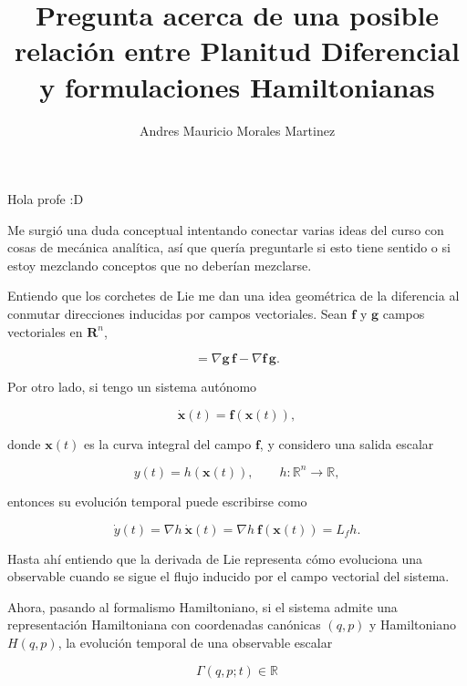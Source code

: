 \documentclass[10pt, oneside]{article}
\title{Pregunta acerca de una posible relación entre Planitud Diferencial y formulaciones Hamiltonianas}
\author{Andres Mauricio Morales Martinez}
\date{}
\newcommand{\R}{\mathbb{R}}
\begin{document}
\maketitle

Hola profe :D

Me surgió una duda conceptual intentando conectar varias ideas del curso con cosas de mecánica analítica, así que quería preguntarle si esto tiene sentido o si estoy mezclando conceptos que no deberían mezclarse.

Entiendo que los corchetes de Lie me dan una idea geométrica de la diferencia al conmutar direcciones inducidas por campos vectoriales. Sean $\mathbf{f}$ y $\mathbf{g}$ campos vectoriales en $\mathbf{R}^n$,

\begin{equation}
	[\mathbf{f},\mathbf{g}]
	=
	\nabla \mathbf{g}\,\mathbf{f}
	-
	\nabla \mathbf{f}\,\mathbf{g}.
\end{equation}

Por otro lado, si tengo un sistema autónomo

\begin{equation}
	\dot{\mathbf{x}}(t)
	=
	\mathbf{f}(\mathbf{x}(t)),
	\label{eq:dynamic}
\end{equation}

donde $\mathbf{x}(t)$ es la curva integral del campo $\mathbf{f}$, y considero una salida escalar

\begin{equation}
	y(t)
	=
	h(\mathbf{x}(t)),
	\qquad
	h:\R^n \to \R,
\end{equation}

entonces su evolución temporal puede escribirse como

\begin{equation}
	\dot{y}(t)
	=
	\nabla h~
	\dot{\mathbf{x}}(t)
	=
	\nabla h~
	\mathbf{f}(\mathbf{x}(t))
	=
	L_f h.
\end{equation}

Hasta ahí entiendo que la derivada de Lie representa cómo evoluciona una observable cuando se sigue el flujo inducido por el campo vectorial del sistema.

Ahora, pasando al formalismo Hamiltoniano, si el sistema admite una representación Hamiltoniana con coordenadas canónicas $(q,p)$ y Hamiltoniano $H(q,p)$, la evolución temporal de una observable escalar

\begin{equation}
	\Gamma(q,p;t)
	\in
	\R
\end{equation}
\end{document}
